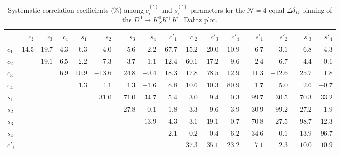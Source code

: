 \documentclass[aps,prd,superscriptaddress,nopreprintnumbers,nofootinbib,showpacs,floatfix]{revtex4}
\begin{document}
\begin{table}[htb]
\caption{Systematic correlation coefficients (\%) among $c^{(\prime)}_{i}$ and $s^{(\prime)}_{i}$ parameters for %
the $\mathcal{N}=4$ equal $\Delta\delta_D$ binning of the $D^{0}\to K^{0}_{S}K^{+}K^{-}$ Dalitz %
plot.}\label{tab:corr_K0SKK_4bin_syst}
\begin{center} 
\begin{tabular}{lrrrrrrrrrrrrrrr} \hline\hline
      & $c_2 $ & $c_3$ & $c_4$ & $s_1$ & $s_2$ & $s_3$ & $s_4$ & $c'_1$ & $c'_2$ & $c'_3$ & $c'_4$ & $s'_1$ & %
$s'_2$ & $s'_3$ & $s'_4$ \\ \hline 
$c_1$ &$  14.5 $ &$  19.7 $ &$  4.3 $  &$  6.3 $  &$ -4.0 $  &$  5.6 $  &$  2.2 $  &$  67.7 $ &$  15.2 $ &$  20.0 $ %
&$  10.9 $ &$  6.7 $  &$ -3.1 $  &$  6.8 $  &$  4.3 $ \\ 
$c_2$ &          &$  19.1 $ &$  6.5 $  &$  2.2 $  &$ -7.3 $  &$  3.7 $  &$ -1.1 $  &$  12.4 $ &$  60.1 $ &$  17.2 $ %
&$  9.6 $  &$  2.4 $  &$ -6.7 $  &$  4.4 $  &$  0.1 $ \\ 
$c_3$ &          &          &$  6.9 $  &$  10.9 $ &$ -13.6 $ &$  24.8 $ &$ -0.4 $  &$  18.3 $ &$  17.8 $ &$  78.5 $ %
&$  12.9 $ &$  11.3 $ &$ -12.6 $ &$  25.7 $ &$  1.8 $ \\ 
$c_4$ &          &          &          &$  1.3 $  &$  4.1 $  &$  1.3 $  &$ -1.6 $  &$  8.8 $  &$  10.6 $ &$  10.3 $ %
&$  80.9 $ &$  1.7 $  &$  5.0 $  &$  2.6 $  &$ -0.7 $ \\ 
$s_1$ &          &          &          &          &$ -31.0 $ &$  71.0 $ &$  34.7 $ &$  5.4 $  &$  3.0 $  &$  9.4 $  %
&$  0.3 $  &$  99.7 $ &$ -30.5 $ &$  70.3 $ &$  33.2 $ \\
$s_2$ &          &          &          &          &          &$ -27.8 $ &$ -0.1 $  &$ -1.8 $  &$ -3.3 $  &$ -9.6 $  %
&$  3.9 $  &$ -30.9 $ &$  99.2 $ &$ -27.2 $ &$  1.9 $ \\ 
$s_3$ &          &          &          &          &          &          &$  13.9 $ &$  4.3 $  &$  3.1 $  &$  19.1 $ %
&$  0.7 $  &$  70.8 $ &$ -27.5 $ &$  98.7 $ &$  12.3 $ \\
$s_4$ &          &          &          &          &          &          &          &$  2.1 $  &$  0.2 $  &$  0.4 $  %
&$ -6.2 $  &$  34.6 $ &$  0.1 $  &$  13.9 $ &$  96.7 $ \\
$c'_1$&          &          &          &          &          &          &          &          &$  37.3 $ &$  35.1 $ %
&$  23.2 $ &$  7.1 $  &$  2.3 $  &$  10.0 $ &$  10.9 $ \\

\end{tabular}
\end{center}
\end{table}
\end{document}
